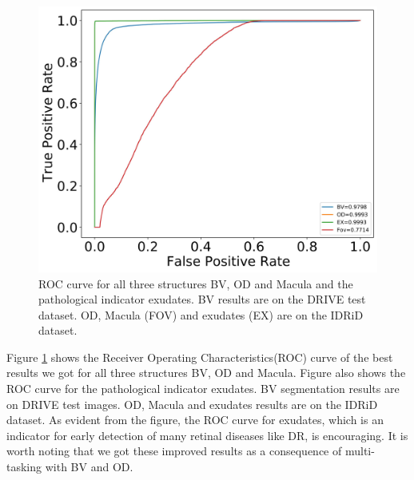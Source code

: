 \documentclass[utf8]{FrontiersinHarvard} %
\begin{document}
\begin{figure}[ht!]
\begin{center}
\includegraphics[width=15cm]{images/roc_all.jpg} %
\end{center}
\caption{ROC curve for all three structures BV, OD and Macula and the pathological indicator exudates. BV results are on the DRIVE test dataset. OD, Macula (FOV) and exudates (EX) are on the IDRiD dataset.
}
\label{fig:roc_auc}
\end{figure}

Figure \ref{fig:roc_auc} shows the Receiver Operating Characteristics(ROC) curve of the best results we got for all three structures BV, OD and Macula. Figure also shows the ROC curve for the pathological indicator exudates. BV segmentation results are on DRIVE test images. OD, Macula and exudates results are on the IDRiD dataset. As evident from the figure, the ROC curve for exudates, which is an indicator for early detection of many retinal diseases like DR, is encouraging. It is worth noting that we got these improved results as a consequence of multi-tasking with BV and OD.
\end{document}
